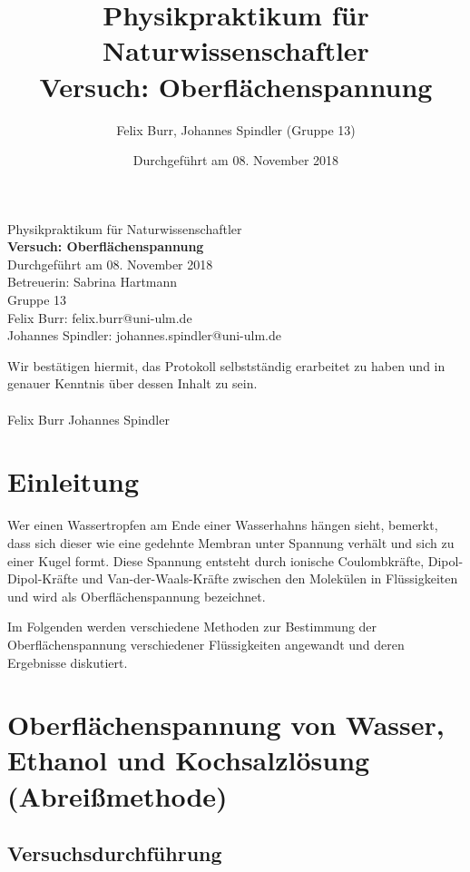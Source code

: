 \documentclass{scrartcl}
\title{Physikpraktikum für Naturwissenschaftler \\ Versuch: Oberflächenspannung}
\author{Felix Burr, Johannes Spindler (Gruppe 13)}
\date{Durchgeführt am 08. November 2018}
\begin{document}
\begin{titlepage}
  \begin{center}
    \vspace*{1cm}
    \LARGE
    Physikpraktikum für Naturwissenschaftler \\
    \vspace*{1cm}
    \Huge
    \textbf{Versuch: Oberflächenspannung} \\
    \vspace*{0.3cm}
    \Large
    Durchgeführt am 08. November 2018 \\
    Betreuerin: Sabrina Hartmann \\
    \vspace*{2.5cm}
    Gruppe 13 \\
    Felix Burr: felix.burr@uni-ulm.de \\
    Johannes Spindler: johannes.spindler@uni-ulm.de \\
    \vfill 
  \end{center}
  Wir bestätigen hiermit, das Protokoll selbstständig erarbeitet zu haben und in genauer Kenntnis über dessen Inhalt zu sein. \\
  \vspace*{0.8cm}
  \\
  Felix Burr
  \hfill
  Johannes Spindler
\end{titlepage}
\pagebreak
\tableofcontents


\pagebreak

\section{Einleitung}
Wer einen Wassertropfen am Ende einer Wasserhahns hängen sieht, bemerkt, dass sich dieser wie eine gedehnte Membran unter Spannung verhält und sich zu einer Kugel formt. Diese Spannung entsteht durch ionische Coulombkräfte, Dipol-Dipol-Kräfte und Van-der-Waals-Kräfte zwischen den Molekülen in Flüssigkeiten und wird als Oberflächenspannung bezeichnet.

Im Folgenden werden verschiedene Methoden zur Bestimmung der Oberflächenspannung verschiedener Flüssigkeiten angewandt und deren Ergebnisse diskutiert.
\section{Oberflächenspannung von Wasser, Ethanol und Kochsalzlösung (Abreißmethode)}
\subsection{Versuchsdurchführung}
\end{document}
